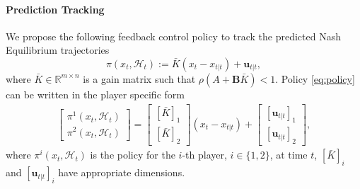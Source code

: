 \documentclass[letterpaper, 10 pt, conference]{ieeeconf}  %
\begin{document}
\paragraph{Prediction Tracking} We propose the following feedback control policy to track the predicted Nash Equilibrium trajectories
\begin{equation}\label{eq:policy}
    \pi(x_{t},\mathcal{H}_{t}) := \bar{K}(x_{t}-x_{t|t}) + \mathbf{u}_{t|t},
\end{equation}
where $\bar{K}\in \mathbb{R}^{m\times n}$ is a gain matrix such that $\rho(A+\mathbf{B}\bar{K}) < 1$. Policy \eqref{eq:policy} can be written in the player specific form
\begin{align*}
\begin{bmatrix}
    \pi^{1}(x_{t},\mathcal{H}_{t})\\
    \pi^{2}(x_{t},\mathcal{H}_{t})
\end{bmatrix}=
    \begin{bmatrix}
        [\bar{K}]_{1}\\
        [\bar{K}]_{2}
    \end{bmatrix}(x_{t}-x_{t|t}) + 
    \begin{bmatrix}
        [\mathbf{u}_{t|t}]_{1}\\
        [\mathbf{u}_{t|t}]_{2}
    \end{bmatrix},
\end{align*}
where $\pi^{i}(x_{t},\mathcal{H}_{t})$ is the policy for the $i$-th player, $i \in \{1,2\}$, at time $t$, $[\bar{K}]_{i}$ and $[\mathbf{u}_{t|t}]_{i}$ have appropriate dimensions.


\end{document}
